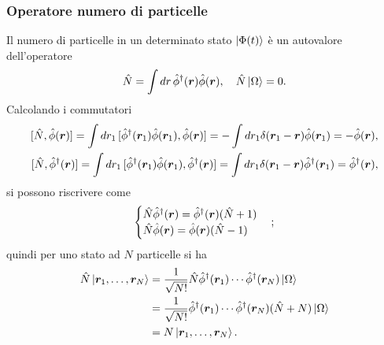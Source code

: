 \subsubsection{Operatore numero di particelle}
Il numero di particelle in un determinato stato $\ket{\Phi(t)}$ è un autovalore dell'operatore
\begin{equation}
    \hat{N} = \int dr\,\hat{\phi}^\dagger(\bm{r})\hat{\phi}(\bm{r}),\quad \hat{N}\ket{\Omega} = 0.
\end{equation}
Calcolando i commutatori
\begin{align}
    \comm{\hatN}{\hatphi(\vr)} = \int dr_1\,\comm{\hatphid(\vr_1)\hatphi(\vr_1)}{\hatphi(\vr)} = -\int dr_1\delta(\vr_1 - \vr)\hatphi(\vr_1) = -\hatphi(\vr), \\
    \comm{\hatN}{\hatphid(\vr)} = \int dr_1\,\comm{\hatphid(\vr_1)\hatphi(\vr_1)}{\hatphid(\vr)} = \int dr_1\delta(\vr_1 - \vr)\hatphid(\vr_1) = \hatphid(\vr),
\end{align}
si possono riscrivere come
\begin{equation}
    \begin{cases}
        \hat{N}\hat{\phi}^\dagger(\bm{r}) = \hat{\phi}^\dagger(\bm{r})(\hat{N} + 1) \\
        \hat{N}\hat{\phi}(\bm{r}) = \hat{\phi}(\bm{r})(\hat{N} - 1)
    \end{cases};
\end{equation}
quindi per uno stato ad $N$ particelle si ha
\begin{equation}
    \begin{split}
        \hat{N}\ket{\bm{r}_1,\dots,\bm{r}_N} &= \frac{1}{\sqrt{N!}}\hat{N}\hat{\phi}^\dagger(\bm{r}_1)\cdots\hat{\phi}^\dagger(\bm{r}_N)\ket{\Omega} \\
        &= \frac{1}{\sqrt{N!}}\hat{\phi}^\dagger(\bm{r}_1)\cdots\hat{\phi}^\dagger(\bm{r}_N)(\hat{N} + N)\ket{\Omega} \\
        &= N\ket{\bm{r}_1,\dots,\bm{r}_N}.
    \end{split}
\end{equation}

